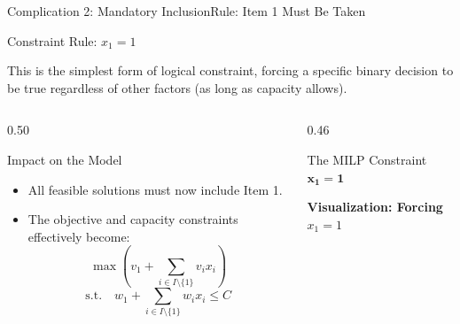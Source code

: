 \documentclass[aspectratio=169]{beamer}
\newenvironment{constraintblock}[1]{
    \begin{block}{Constraint Rule: #1}
    \vspace{-0.3em}
}{
    \end{block}
}
\begin{document}
\begin{frame}{Complication 2: Mandatory Inclusion}{Rule: Item 1 Must Be Taken}
    \vspace{-0.2em}
    \begin{constraintblock}{$x_1 = 1$}
        This is the simplest form of logical constraint, forcing a specific binary decision to be true regardless of other factors (as long as capacity allows).
    \end{constraintblock}
    \vspace{-0.2em}
    \begin{columns}[T]
        \begin{column}{0.50\textwidth}
            \begin{alertblock}{Impact on the Model}
            \footnotesize
                \begin{itemize}
                    \item All feasible solutions must now include Item 1.
                    \item The objective and capacity constraints effectively become:
                    \[ \max \left(v_1 + \sum_{i \in I \setminus \{1\}} v_i x_i\right) \]
                    \[ \text{s.t.} \quad w_1 + \sum_{i \in I \setminus \{1\}} w_i x_i \le C \]
                \end{itemize}
            \end{alertblock}
        \end{column}
        \begin{column}{0.46\textwidth}
            \begin{block}{The MILP Constraint}
                \centering $\mathbf{x_1 = 1}$
            \end{block}
            \centering
            \footnotesize \textbf{Visualization: Forcing $x_1=1$}\\[2pt]
\end{column}
\end{columns}
\end{frame}
\end{document}
